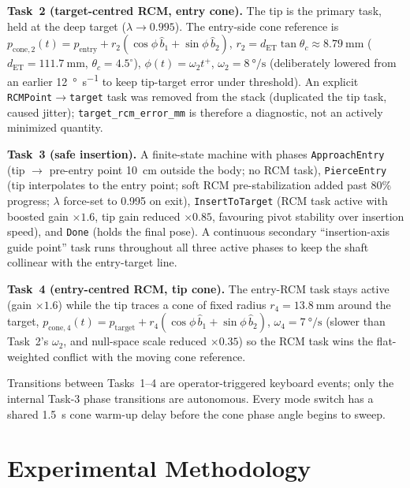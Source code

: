\documentclass[11pt,a4paper]{article}
\newcommand{\code}[1]{\texttt{#1}}
\begin{document}
\textbf{Task~2 (target-centred RCM, entry cone).} The tip is the primary task, held at the deep target ($\lambda\to0.995$). The entry-side cone reference is $p_{\mathrm{cone},2}(t)=p_{\mathrm{entry}}+r_2(\cos\phi\,\hat b_1+\sin\phi\,\hat b_2)$, $r_2=d_{\mathrm{ET}}\tan\theta_c\approx\SI{8.79}{\milli\meter}$ ($d_{\mathrm{ET}}=\SI{111.7}{\milli\meter}$, $\theta_c=4.5^{\circ}$), $\phi(t)=\omega_2 t^+$, $\omega_2=\SI{8}{\degree\per\second}$ (deliberately lowered from an earlier \SI{12}{\degree\per\second} to keep tip-target error under threshold). An explicit \code{RCMPoint}$\to$\code{target} task was removed from the stack (duplicated the tip task, caused jitter); \code{target\_rcm\_error\_mm} is therefore a diagnostic, not an actively minimized quantity.

\textbf{Task~3 (safe insertion).} A finite-state machine with phases \code{ApproachEntry} (tip $\to$ pre-entry point \SI{10}{\centi\meter} outside the body; no RCM task), \code{PierceEntry} (tip interpolates to the entry point; soft RCM pre-stabilization added past 80\% progress; $\lambda$ force-set to 0.995 on exit), \code{InsertToTarget} (RCM task active with boosted gain $\times1.6$, tip gain reduced $\times0.85$, favouring pivot stability over insertion speed), and \code{Done} (holds the final pose). A continuous secondary ``insertion-axis guide point'' task runs throughout all three active phases to keep the shaft collinear with the entry-target line.

\textbf{Task~4 (entry-centred RCM, tip cone).} The entry-RCM task stays active (gain $\times1.6$) while the tip traces a cone of fixed radius $r_4=\SI{13.8}{\milli\meter}$ around the target, $p_{\mathrm{cone},4}(t)=p_{\mathrm{target}}+r_4(\cos\phi\,\hat b_1+\sin\phi\,\hat b_2)$, $\omega_4=\SI{7}{\degree\per\second}$ (slower than Task~2's $\omega_2$, and null-space scale reduced $\times0.35$) so the RCM task wins the flat-weighted conflict with the moving cone reference.

Transitions between Tasks~1--4 are operator-triggered keyboard events; only the internal Task-3 phase transitions are autonomous. Every mode switch has a shared \SI{1.5}{\second} cone warm-up delay before the cone phase angle begins to sweep.

\section{Experimental Methodology}
\label{sec:methodology}
\end{document}
